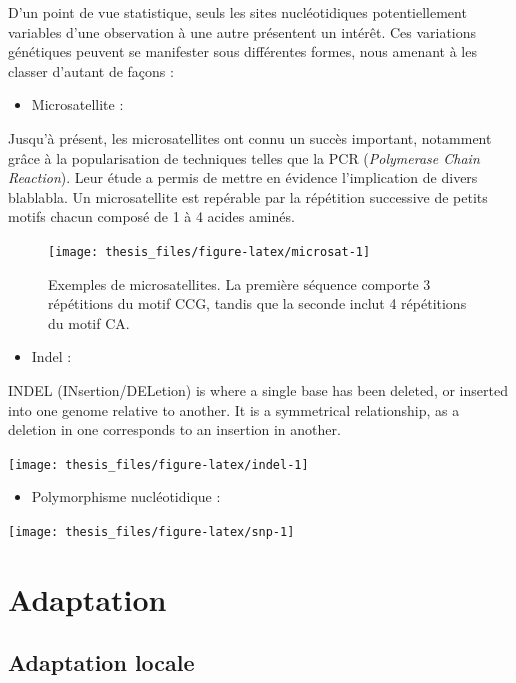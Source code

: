 \documentclass[12pt,twoside]{ugathesis}
\providecommand{\tightlist}{%
  \setlength{\itemsep}{0pt}\setlength{\parskip}{0pt}}
\begin{document}
  D'un point de vue statistique, seuls les sites nucléotidiques
  potentiellement variables d'une observation à une autre présentent un
  intérêt. Ces variations génétiques peuvent se manifester sous
  différentes formes, nous amenant à les classer d'autant de façons :
  \begin{itemize}
  \tightlist
  \item
    Microsatellite :
  \end{itemize}
  Jusqu'à présent, les microsatellites ont connu un succès important,
  notamment grâce à la popularisation de techniques telles que la PCR
  (\textit{Polymerase Chain Reaction}). Leur étude a permis de mettre en
  évidence l'implication de divers blablabla. Un microsatellite est
  repérable par la répétition successive de petits motifs chacun composé
  de 1 à 4 acides aminés.
  \begin{figure}
  
  {\centering \texttt{[image: thesis\_files/figure-latex/microsat-1]} 
  
  }
  
  \caption{Exemples de microsatellites. La première séquence comporte 3 répétitions du motif CCG, tandis que la seconde inclut 4 répétitions du motif CA.}\label{fig:microsat}
  \end{figure}
  \begin{itemize}
  \tightlist
  \item
    Indel :
  \end{itemize}
  INDEL (INsertion/DELetion) is where a single base has been deleted, or
  inserted into one genome relative to another. It is a symmetrical
  relationship, as a deletion in one corresponds to an insertion in
  another.
  \begin{center}\texttt{[image: thesis\_files/figure-latex/indel-1]} \end{center}
  \begin{itemize}
  \tightlist
  \item
    Polymorphisme nucléotidique :
  \end{itemize}
  \begin{center}\texttt{[image: thesis\_files/figure-latex/snp-1]} \end{center}
  
  \section{Adaptation}\label{adaptation}
  
  \subsection{Adaptation locale}\label{adaptation-locale}
  
\end{document}
